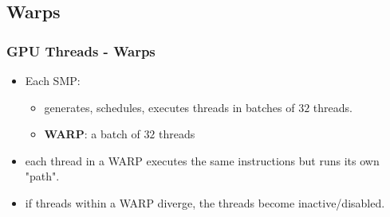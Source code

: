 \subsection{Warps}
\begin{frame}
\frametitle{GPU Threads - Warps}	
\begin{itemize}
  \item Each SMP:	
  \begin{itemize}
     \item generates, schedules, executes threads in batches of $32$ threads.
     \item \textbf{WARP}: a batch of $32$ threads
  \end{itemize}
  \item each thread in a WARP executes the same instructions but runs its own "path".
  \item if threads within a WARP diverge, the threads become inactive/disabled.
\end{itemize}	   
\end{frame} 
